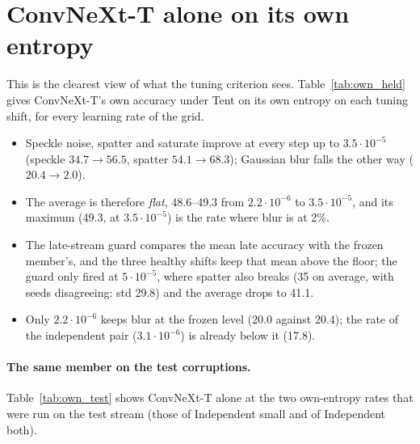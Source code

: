 \documentclass[10pt]{article}
\newcommand{\cnx}{ConvNeXt-T}
\begin{document}
\section{\cnx{} alone on its own entropy}\label{sec:own}
This is the clearest view of what the tuning criterion sees. Table~\ref{tab:own_held} gives \cnx{}'s own accuracy under Tent on its own entropy on each tuning shift, for every learning rate of the grid.

\begin{table}[H]
  \centering\small
  \caption{\cnx{} alone, Tent on its own entropy, on the four tuning shifts (accuracy \%, mean $\pm$ std over 3 seeds). $\dagger$: the \cnx{} rate of the independent pair; $\ddagger$: the rate tuned for \cnx{} alone (highest average). ``worst shift'' is the lowest of the four shift averages.}
  \label{tab:own_held}
  
\end{table}

\begin{itemize}
  \item Speckle noise, spatter and saturate improve at every step up to \(3.5{\cdot}10^{-5}\) (speckle \(34.7 \to 56.5\), spatter \(54.1 \to 68.3\)); Gaussian blur falls the other way (\(20.4 \to 2.0\)).
  \item The average is therefore \emph{flat}, 48.6--49.3 from \(2.2{\cdot}10^{-6}\) to \(3.5{\cdot}10^{-5}\), and its maximum (49.3, at \(3.5{\cdot}10^{-5}\)) is the rate where blur is at 2\%.
  \item The late-stream guard compares the mean late accuracy with the frozen member's, and the three healthy shifts keep that mean above the floor; the guard only fired at \(5{\cdot}10^{-5}\), where spatter also breaks (35 on average, with seeds disagreeing: std 29.8) and the average drops to 41.1.
  \item Only \(2.2{\cdot}10^{-6}\) keeps blur at the frozen level (20.0 against 20.4); the rate of the independent pair (\(3.1{\cdot}10^{-6}\)) is already below it (17.8).
\end{itemize}

\paragraph{The same member on the test corruptions.} Table~\ref{tab:own_test} shows \cnx{} alone at the two own-entropy rates that were run on the test stream (those of Independent small and of Independent both).

\begin{table}[H]
  \centering\small
  \caption{\cnx{} alone on the 15 test corruptions (accuracy \%, mean $\pm$ std over 3 seeds): frozen, and Tent on its own entropy at the pair's rate and at the single-model rate. Both rates were selected on the tuning shifts.}
  \label{tab:own_test}
  
\end{table}
\end{document}
